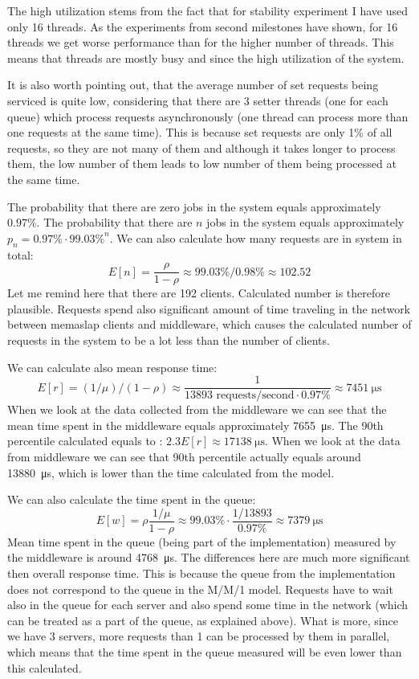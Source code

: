 \documentclass[11pt]{article}
\begin{document}
The high utilization stems from the fact that for stability experiment I have used only 16 threads. As the experiments from second milestones have shown, for 16 threads we get worse performance than for the higher number of threads. This means that threads are mostly busy and since the high utilization of the system.

It is also worth pointing out, that the average number of set requests being serviced is quite low, considering that there are 3 setter threads (one for each queue) which process requests asynchronously (one thread can process more than one requests at the same time). This is because set requests are only 1\% of all requests, so they are not many of them and although it takes longer to process them, the low number of them leads to low number of them being processed at the same time.

The  probability that there are zero jobs in the system equals approximately $0.97\%$. The probability that there are $n$ jobs in the system equals approximately $p_n = 0.97\% \cdot 99.03\%^n$. We can also calculate how many requests are in system in total:
$$E[n] = \frac{\rho}{1 - \rho} \approx{99.03\%}/{0.98\%} \approx 102.52$$
Let me remind here that there are 192 clients. Calculated number is therefore plausible. Requests spend also significant amount of time traveling in the network between memaslap clients and middleware, which causes the calculated number of requests in the system to be a lot less than the number of clients.

We can calculate also mean response time:
$$E[r] = (1/\mu)/(1 - \rho) \approx \frac{1}{13893 \textrm{ requests/second} \cdot 0.97\%} \approx \SI{7451}{\micro\second}$$
When we look at the data collected from the middleware we can see that the mean time spent in the middleware equals approximately \SI{7655}{\micro\second}.
The 90th percentile calculated equals to : $2.3 E[r] \approx \SI{17138}{\micro\second}$. When we look at the data from middleware we can see that 90th percentile actually equals around \SI{13880}{\micro\second}, which is lower than the time calculated from the model.

We can also calculate the time spent in the queue:
$$E[w] = \rho \frac{1/\mu}{1 - \rho} \approx 99.03\% \cdot \frac{1/13893}{0.97\%} \approx \SI{7379}{\micro\second}$$
Mean time spent in the queue (being part of the implementation) measured by the middleware is around \SI{4768}{\micro\second}. The differences here are much more significant then overall response time. This is because the queue from the implementation does not correspond to the queue in the M/M/1 model. Requests have to wait also in the queue for each server and also spend some time in the network (which can be treated as a part of the queue, as explained above). What is more, since we have 3 servers, more requests than 1 can be processed by them in parallel, which means that the time spent in the queue measured will be even lower than this calculated.
\end{document}
